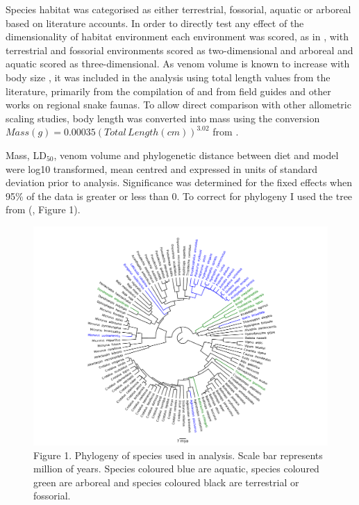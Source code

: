 Species habitat was categorised as either terrestrial, fossorial, aquatic or arboreal based on literature accounts. In order to directly test any effect of the dimensionality of habitat environment each environment was scored, as in \cite{pawar2012dimensionality}, with terrestrial and fossorial environments scored as two-dimensional and arboreal and aquatic scored as three-dimensional.
As venom volume is known to increase with body size \citep{mirtschin2002influences}, it was included in the analysis using total length values from the literature, primarily from the compilation of \citep{boback2003empirical} and from field guides and other works on regional snake faunas. To allow direct comparison with other allometric scaling studies, body length was converted into mass using the conversion $Mass (g) = 0.00035({Total\,Length(cm)})^{3.02}$ from \cite{pough1980advantages}.


Mass, LD$_{50}$, venom volume and phylogenetic distance between diet and model were log10 transformed, mean centred and expressed in units of standard deviation prior to analysis. Significance was determined for the fixed effects when 95\% of the data is greater or less than 0. To correct for phylogeny I used the tree from (\cite{pyron2014early}, Figure 1). 


\begin{figure}[h]
  \centering
  \includegraphics[width=.95\textwidth]{ch4-snakes/fig1_snake_phylo.pdf}%
  \caption[ ]{Figure 1. Phylogeny of species used in analysis. Scale bar represents million of years. Species coloured blue are aquatic, species coloured green are arboreal and species coloured black are terrestrial or fossorial.}
  \label{fig:Figure 1.}
\end{figure}



